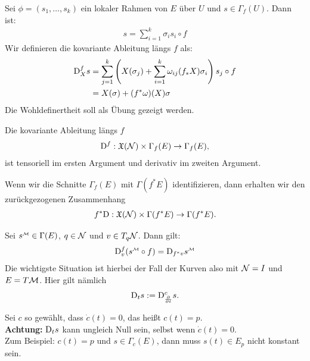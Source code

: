 \begin{defs}
Sei $\phi = (s_1, \dots, s_k)$ ein lokaler Rahmen von $E$ über $U$ und $s \in \Gamma_f (U)$. 
Dann ist:
\begin{align}
s = \sum^{k}_{i=1} \sigma_i s_i \circ f
\end{align}
Wir definieren die kovariante Ableitung längs $f$ als:
\begin{align}
\mathrm{D}^{f}_X s &= \sum^k_{j=1} \left( X(\sigma_j) + \sum^k_{i=1} \omega_{ij}(f_\ast X)\sigma_i \right) s_j \circ f\\
&= X(\sigma) + (f^\ast \omega)(X) \sigma
\end{align}
Die Wohldefinertheit soll als Übung gezeigt werden.
\end{defs}
\begin{satz}
Die kovariante Ableitung längs $f$
\begin{align*}
\mathrm{D}^f: \mathfrak{X}(\mathcal{N}) \times \Gamma_f (E) \to \Gamma_f (E),
\end{align*}
ist tensoriell im ersten Argument und derivativ im zweiten Argument.
\end{satz}
Wenn wir die Schnitte $\Gamma_f (E)$ mit $\Gamma(f^\ast E)$ identifizieren, dann erhalten wir den zurückgezogenen Zusammenhang
\begin{align}
f^\ast \mathrm{D} : \mathfrak{X}(\mathcal{N}) \times\Gamma(f^\ast E) \to \Gamma(f^\ast E).
\end{align}
\begin{satz}
Sei $s^\text{{\begin{tiny}$\mfk$\end{tiny}}} \in \Gamma(E)$, $q \in \mathcal{N}$ und $v\in T_q \mathcal{N}$.
Dann gilt:
\begin{align}
\covd^f_v (s^\text{{\begin{tiny}$\mfk$\end{tiny}}} \circ f) = \covd_{f^\ast v} s^\text{{\begin{tiny}$\mfk$\end{tiny}}}
\end{align}
Die wichtigste Situation ist hierbei der Fall der Kurven also mit $\mathcal{N} = I$ und $E = T\mathcal{M}$.
Hier gilt nämlich
\begin{align}
\mathrm{D}_t s := \mathrm{D}^c_{\pdv{t}} s.
\end{align}
\end{satz}
\begin{bem}
Sei $c$ so gewählt, dass $\dot{c}(t) = 0$, das heißt $c(t)=p$.\\
\textbf{Achtung:} $\mathrm{D}_t s$ kann ungleich Null sein, selbst wenn $\dot{c}(t) = 0$.\\
Zum Beispiel: $c(t)=p$ und $s \in \Gamma_c (E)$, dann muss $s(t) \in E_p$ nicht konstant sein.
\end{bem}
